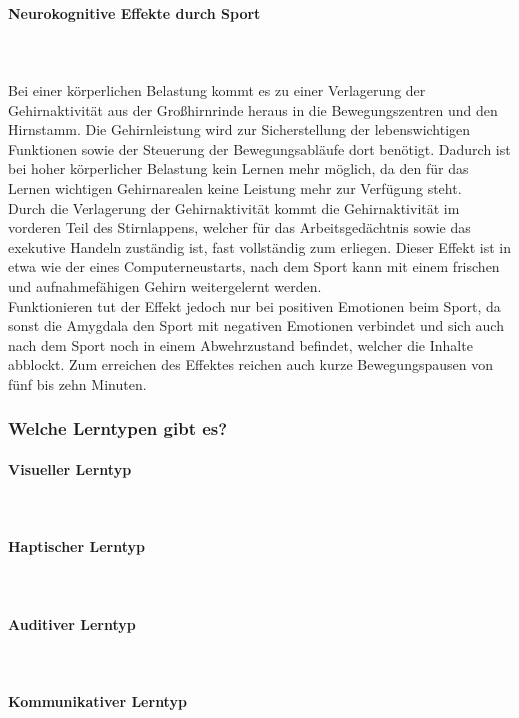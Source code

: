 \paragraph{Neurokognitive Effekte durch Sport}~\\
\\
Bei einer körperlichen Belastung kommt es zu einer Verlagerung der Gehirnaktivität aus der Großhirnrinde heraus in die Bewegungszentren und den Hirnstamm. Die Gehirnleistung wird zur Sicherstellung der lebenswichtigen Funktionen sowie der Steuerung der Bewegungsabläufe dort benötigt. Dadurch ist bei hoher körperlicher Belastung kein Lernen mehr möglich, da den für das Lernen wichtigen Gehirnarealen keine Leistung mehr zur Verfügung steht.\\
Durch die Verlagerung der Gehirnaktivität kommt die Gehirnaktivität im vorderen Teil des Stirnlappens, welcher für das Arbeitsgedächtnis sowie das exekutive Handeln zuständig ist, fast vollständig zum erliegen. Dieser Effekt ist in etwa wie der eines Computerneustarts, nach dem Sport kann mit einem frischen und aufnahmefähigen Gehirn weitergelernt werden.\\
Funktionieren tut der Effekt jedoch nur bei positiven Emotionen beim Sport, da sonst die Amygdala den Sport mit negativen Emotionen verbindet und sich auch nach dem Sport noch in einem Abwehrzustand befindet, welcher die Inhalte abblockt. Zum erreichen des Effektes reichen auch kurze Bewegungspausen von fünf bis zehn Minuten.\\

\subsubsection{Welche Lerntypen gibt es?}

\paragraph{Visueller Lerntyp}~\\
\paragraph{Haptischer Lerntyp}~\\
\paragraph{Auditiver Lerntyp}~\\
\paragraph{Kommunikativer Lerntyp}~\\

